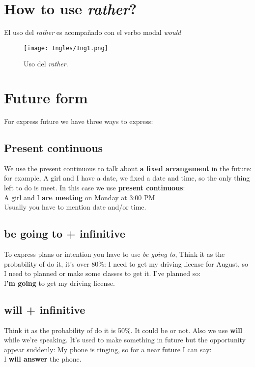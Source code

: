 \documentclass[
	12pt, %
	fleqn, %
	a4paper, %
	oneside, %
]{LegrandOrangeBook}
\begin{document}
\section{How to use \textit{rather}?}
El uso del \textit{rather} es acompañado con el verbo modal \textit{would}
\begin{figure}[H]
\centering
\texttt{[image: Ingles/Ing1.png]}
\caption{Uso del \textit{rather}.}
\end{figure}
\section{Future form}
For express future we have three ways to express:
\subsection{Present continuous}
We use the present continuous to talk about \textbf{a fixed arrangement} in the future: for example, A girl and I have a date, we fixed a date and time, so the only thing left to do is meet. In this case we use \textbf{present continuous}:\\
A girl and I \textbf{are meeting} on Monday at 3:00 PM\\
Usually you have to mention date and/or time.
\subsection{be going to + infinitive}
To express plans or intention you have to use \textit{be going to}, Think it as the probability of do it, it's over 80\%: I need to get my driving license for August, so I need to planned or make some classes to get it. I've planned so:\\
I\textbf{'m going} to get my driving license.
\subsection{will + infinitive}
Think it as the probability of do it is 50\%. It could be or not. Also we use \textbf{will} while we're speaking. It's used to make something in future but the opportunity appear suddenly: My phone is ringing, so for a near future I can say:\\
I \textbf{will answer} the phone.
\end{document}
